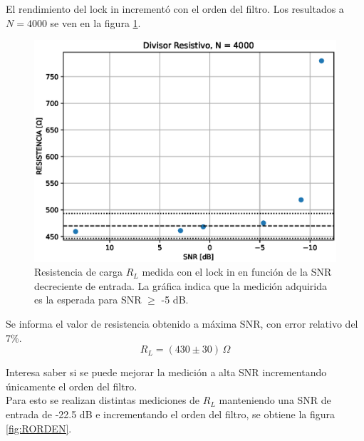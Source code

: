 \documentclass[11pt,a4paper]{extarticle}
\begin{document}
\begin{multicols}{2}
El rendimiento del lock in incrementó con el orden del filtro. Los resultados a $N = 4000$ se ven en la figura \ref{fig:RvsSNR}.

\begin{figure}[H]
	\centering
	\includegraphics[width=\linewidth]{Images/resistencia4000.eps}
	\caption{Resistencia de carga $R_L$ medida con 
	el lock in en función de la SNR decreciente de entrada. La gráfica indica que la medición adquirida es la esperada para SNR $\ge$ -5 dB.}
	\label{fig:RvsSNR}
\end{figure}

Se informa el valor de resistencia obtenido a máxima SNR, con error relativo del 7\%.
\begin{equation*}
	R_L = \left(430 \pm 30\right) \, \Omega
\end{equation*}

Interesa saber si se puede mejorar la medición a alta SNR incrementando únicamente el orden del filtro.\\


Para esto se realizan distintas mediciones de $R_L$
manteniendo una SNR de entrada de -22.5 dB e incrementando el orden del filtro, se obtiene la figura \ref{fig:RORDEN}.\\



\end{multicols}
\end{document}
